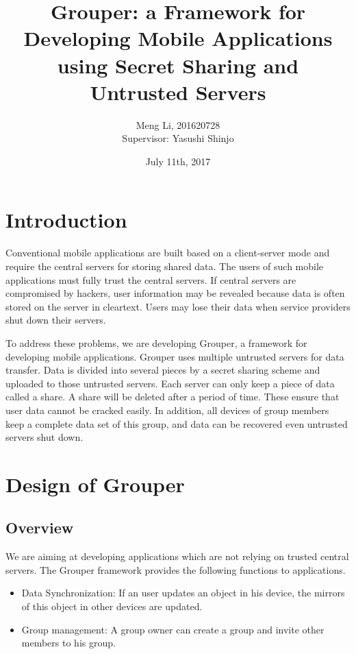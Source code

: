 \documentclass[twocolumn,10pt]{article}
\begin{document}
\small
\date{July 11th, 2017}

\title{\bf Grouper: a Framework for Developing Mobile Applications using Secret Sharing and Untrusted Servers}

\author{
	Meng Li, 201620728  
	\\ Supervisor: Yasushi Shinjo
}

\maketitle

\section{Introduction}

Conventional mobile applications are built based on a client-server mode and require the central servers for storing shared data. 
The users of such mobile applications must fully trust the central servers. 
If central servers are compromised by hackers, user information may be revealed because data is often stored on the server in cleartext. 
Users may lose their data when service providers shut down their servers. 

To address these problems, we are developing Grouper, a framework for developing mobile applications. 
Grouper uses multiple untrusted servers for data transfer.
Data is divided into several pieces by a secret sharing scheme and uploaded to those untrusted servers. 
Each server can only keep a piece of data called a share. A share will be deleted after a period of time. 
These ensure that user data cannot be cracked easily. 
In addition, all devices of group members keep a complete data set of this group, and data can be recovered even untrusted servers shut down.

\section{Design of Grouper}

\subsection{Overview}

We are aiming at developing applications which are not relying on trusted central servers. 
The Grouper framework provides the following functions to applications.

\begin{itemize}
	\setlength{\itemsep}{1pt}
	\setlength{\parskip}{0pt}
	\setlength{\parsep}{0pt}
	\item Data Synchronization: If an user updates an object in his device, the mirrors of this object in other devices are updated.
	\item Group management: A group owner can create a group and invite other members to his group.
\end{itemize}
\end{document}
